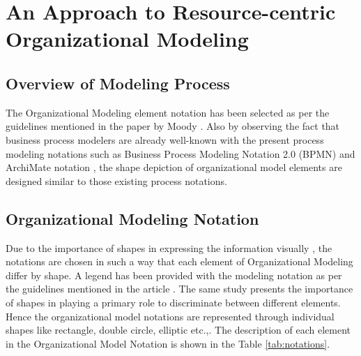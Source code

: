 \chapter{An Approach to Resource-centric Organizational Modeling}
\label{chap:approach}

\section{Overview of Modeling Process}
\label{sec:overviewmodelingprocess}
\hspace{4ex} The Organizational Modeling element notation has been selected as per the guidelines mentioned in the paper by Moody \cite{Moody2009}. Also by observing  the fact that business process modelers are already well-known with the present process modeling notations such as Business Process Modeling Notation 2.0 (BPMN) \cite{bpm2011} and ArchiMate notation \cite{arc2013}, the shape depiction of organizational model elements are designed similar to those existing process notations. 





\section{Organizational Modeling Notation}
\label{sec:orgmodelingnotation}
\hspace{4ex} Due to the importance of shapes in expressing the information visually , the notations are chosen in such a way that each element of Organizational Modeling  differ by shape. A legend has been provided with the modeling notation as per the guidelines mentioned in the article \cite{Moody2009}. The same study \cite{Moody2009} presents the importance of shapes in playing a primary role to discriminate between different elements. Hence the organizational model notations are represented through individual shapes like rectangle, double circle, elliptic etc.,. The description of each element in the Organizational Model Notation is shown in the Table \ref{tab:notations}. 

